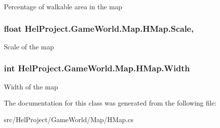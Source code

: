Percentage of walkable area in the map 

\hypertarget{class_hel_project_1_1_game_world_1_1_map_1_1_h_map_a023973ffc8b857d992378e235632021c}{}
\subsubsection[{Scale}]{\setlength{\rightskip}{0pt plus 5cm}float Hel\+Project.\+Game\+World.\+Map.\+H\+Map.\+Scale\hspace{0.3cm}{\ttfamily [get]}, {\ttfamily [set]}}\label{class_hel_project_1_1_game_world_1_1_map_1_1_h_map_a023973ffc8b857d992378e235632021c}


Scale of the map 

\hypertarget{class_hel_project_1_1_game_world_1_1_map_1_1_h_map_aeb3db69a653089c32c2b61c7612bd106}{}
\subsubsection[{Width}]{\setlength{\rightskip}{0pt plus 5cm}int Hel\+Project.\+Game\+World.\+Map.\+H\+Map.\+Width\hspace{0.3cm}{\ttfamily [get]}}\label{class_hel_project_1_1_game_world_1_1_map_1_1_h_map_aeb3db69a653089c32c2b61c7612bd106}


Width of the map 



The documentation for this class was generated from the following file\+:\begin{DoxyCompactItemize}
\item 
src/\+Hel\+Project/\+Game\+World/\+Map/H\+Map.\+cs\end{DoxyCompactItemize}
